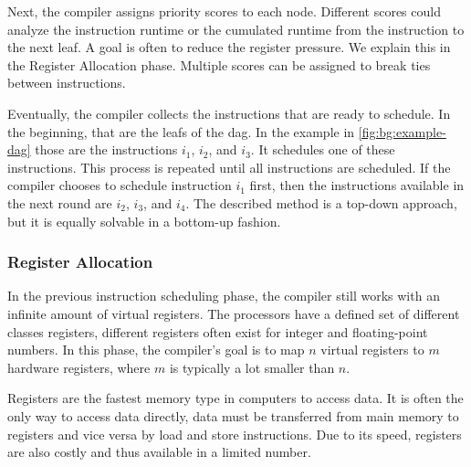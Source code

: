 Next, the compiler assigns priority scores to each node.
Different scores could analyze the instruction runtime or the cumulated runtime from the instruction to the next leaf.
A goal is often to reduce the register pressure. 
We explain this in the Register Allocation phase.
Multiple scores can be assigned to break ties between instructions.

Eventually, the compiler collects the instructions that are ready to schedule.
In the beginning, that are the leafs of the \ac{dag}.
In the example in \cref{fig:bg:example-dag} those are the instructions $i_1$, $i_2$, and $i_3$.
It schedules one of these instructions.
This process is repeated until all instructions are scheduled.
If the compiler chooses to schedule instruction $i_1$ first, then the instructions available in the next round are $i_2$, $i_3$, and $i_4$.
The described method is a top-down approach, but it is equally solvable in a bottom-up fashion.




\subsubsection{Register Allocation}
In the previous instruction scheduling phase, the compiler still works with an infinite amount of virtual registers.
The processors have a defined set of different classes registers, \eg different registers often exist for integer and floating-point numbers.
In this phase, the compiler's goal is to map $n$ virtual registers to $m$ hardware registers, where $m$ is typically a lot smaller than $n$.

Registers are the fastest memory type in computers to access data.
It is often the only way to access data directly, \ie data must be transferred from main memory to registers and vice versa by load and store instructions.
Due to its speed, registers are also costly and thus available in a limited number.


